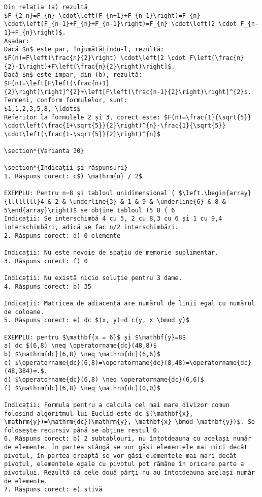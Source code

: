 \begin{verbatim}
Din relația (a) rezultă
$F_{2 n}=F_{n} \cdot\left(F_{n+1}+F_{n-1}\right)=F_{n} \cdot\left(F_{n-1}+F_{n}+F_{n-1}\right)=F_{n} \cdot\left(2 \cdot F_{n-1}+F_{n}\right)$.
Așadar:
Dacă $n$ este par, înjumătățindu-l, rezultă:
$F(n)=F\left(\frac{n}{2}\right) \cdot\left[2 \cdot F\left(\frac{n}{2}-1\right)+F\left(\frac{n}{2}\right)\right]$.
Dacă $n$ este impar, din (b), rezultă:
$F(n)=\left[F\left(\frac{n+1}{2}\right)\right]^{2}+\left[F\left(\frac{n-1}{2}\right)\right]^{2}$.
Termeni, conform formulelor, sunt:
$1,1,2,3,5,8, \ldots$
Referitor la formulele 2 și 3, corect este: $F(n)=\frac{1}{\sqrt{5}} \cdot\left(\frac{1+\sqrt{5}}{2}\right)^{n}-\frac{1}{\sqrt{5}} \cdot\left(\frac{1-\sqrt{5}}{2}\right)^{n}$

\section*{Varianta 30}

\section*{Indicații și răspunsuri}
1. Răspuns corect: c$) \mathrm{n} / 2$

EXEMPLU: Pentru n=8 și tabloul unidimensional ( $\left.\begin{array}{llllllll}4 & 2 & \underline{3} & 1 & 9 & \underline{6} & 8 & 5\end{array}\right)$ se obține tabloul (5 8 ( 6
Indicații: Se interschimbă 4 cu 5, 2 cu 8,3 cu 6 și 1 cu 9,4 interschimbări, adică se fac n/2 interschimbări.
2. Răspuns corect: d) 0 elemente

Indicații: Nu este nevoie de spațiu de memorie suplimentar.
3. Răspuns corect: f) 0

Indicații: Nu există nicio soluție pentru 3 dame.
4. Răspuns corect: b) 35

Indicații: Matricea de adiacență are numărul de linii egal cu numărul de coloane.
5. Răspuns corect: e) dc $(x, y)=d c(y, x \bmod y)$

EXEMPLU: pentru $\mathbf{x = 6}$ și $\mathbf{y}=8$
a) dc $(6,8) \neq \operatorname{dc}(48,8)$
b) $\mathrm{dc}(6,8) \neq \mathrm{dc}(6,6)$
c) $\operatorname{dc}(6,8)=\operatorname{dc}(8,48)=\operatorname{dc}(48,384)=.$.
d) $\operatorname{dc}(6,8) \neq \operatorname{dc}(6,6)$
f) $\mathrm{dc}(6,8) \neq \mathrm{dc}(0,0)$

Indicații: Formula pentru a calcula cel mai mare divizor comun folosind algoritmul lui Euclid este dc $(\mathbf{x}, \mathrm{y})=\mathrm{dc}(\mathrm{y}, \mathbf{x} \bmod \mathbf{y})$. Se folosește recursiv până se obține restul 0.
6. Răspuns corect: b) 2 subtablouri, nu întotdeauna cu același număr de elemente. În partea stângă se vor găsi elementele mai mici decât pivotul, în partea dreaptă se vor găsi elementele mai mari decât pivotul, elementele egale cu pivotul pot rămâne în oricare parte a pivotului. Rezultă că cele două părți nu au întotdeauna același număr de elemente.
7. Răspuns corect: e) stivă


\end{verbatim}
